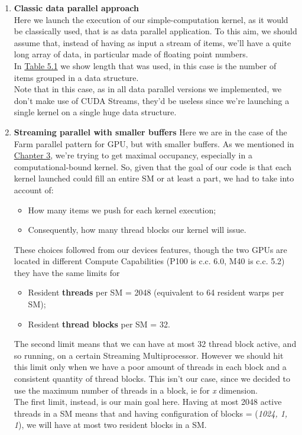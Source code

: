 	
\begin{enumerate}
	\item \textbf{Classic data parallel approach}\\
		Here we launch the execution of our simple-computation kernel, as it would be classically used, that is as data parallel application.
		To this aim, we should assume that, instead of having as input a stream of items, we'll have a quite long array of data, in particular made of floating point numbers.\\
		In \hyperref[tab:cosdata]{Table 5.1} we show length that was used, in this case is the number of items grouped in a data structure.\\
		Note that in this case, as in all data parallel versions we implemented, we don't make use of CUDA Streams, they'd be useless since we're launching a single kernel on a single huge data structure.

		
	\item \textbf{Streaming parallel with smaller buffers}
		Here we are in the case of the Farm parallel pattern for GPU, but with smaller buffers.
		As we mentioned in \hyperref[chap:logic]{Chapter 3}, we're trying to get maximal occupancy, especially in a computational-bound kernel. So, given that the goal of our code is that each kernel launched could fill an entire SM or at least a part, we had to take into account of: 
		\begin{itemize}
			\item How many items we push for each kernel execution;
			\item Consequently, how many thread blocks our kernel will issue.
		\end{itemize}
		These choices followed from our devices features, though the two GPUs are located in different Compute Capabilities (P100 is c.c. 6.0, M40 is c.c. 5.2) they have the same limits for 
		\begin{itemize}
			\item Resident \textbf{threads} per SM = 2048 (equivalent to 64 resident warps per SM);
			\item Resident \textbf{thread blocks} per SM = 32.
		\end{itemize}
		The second limit means that we can have at most 32 thread block active, and so running, on a certain Streaming Multiprocessor. However we should hit this limit only when we have a poor amount of threads in each block and a consistent quantity of thread blocks.
		This isn't our case, since we decided to use the maximum number of threads in a block, ie for \textit{x} dimension.\\
		The first limit, instead, is our main goal here. Having at most 2048 active threads in a SM means that and having configuration of blocks = (\textit{1024, 1, 1}), we will have at most two resident blocks in a SM.
		

\end{enumerate}
